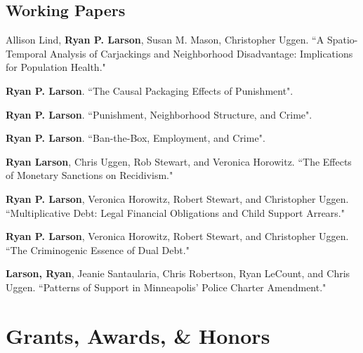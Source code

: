 \documentclass[letterpaper]{article}
\renewenvironment{itemize}{
  \begin{list}{}{
    \setlength{\leftmargin}{1.5em}
  }
}{
  \end{list}
}
\begin{document}
\subsection*{Working Papers}
\begin{itemize}

\item Allison Lind, \textbf{Ryan P. Larson}, Susan M. Mason, Christopher Uggen. ``A Spatio-Temporal Analysis of Carjackings and Neighborhood Disadvantage: Implications for Population Health."
\item \textbf{Ryan P. Larson}. ``The Causal Packaging Effects of Punishment".
\item \textbf{Ryan P. Larson}. ``Punishment, Neighborhood Structure, and Crime".
\item \textbf{Ryan P. Larson}. ``Ban-the-Box, Employment, and Crime".
\item \textbf{Ryan Larson},  Chris Uggen, Rob Stewart, and Veronica Horowitz. ``The Effects of Monetary Sanctions on Recidivism."
\item \textbf{Ryan P. Larson}, Veronica Horowitz, Robert Stewart, and Christopher Uggen. ``Multiplicative Debt: Legal Financial Obligations and Child Support Arrears."
\item \textbf{Ryan P. Larson}, Veronica Horowitz, Robert Stewart, and Christopher Uggen. ``The Criminogenic Essence of Dual Debt."
\item \textbf{Larson, Ryan}, Jeanie Santaularia, Chris Robertson, Ryan LeCount, and Chris Uggen.  ``Patterns of Support in Minneapolis’ Police Charter Amendment." 



\end{itemize}

\section*{\textbf{Grants, Awards, \& Honors}}
\end{document}
